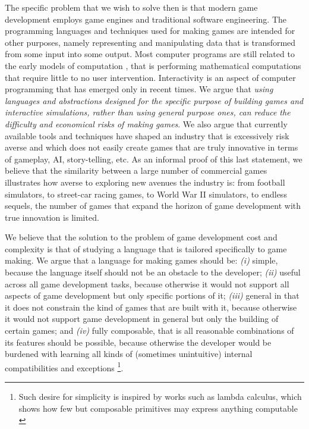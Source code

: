 The specific problem that we wish to solve then is that modern game development employs game engines and traditional software engineering. The programming languages and techniques used for making games are intended for other purposes, namely representing and manipulating data that is transformed from some input into some output. Most computer programs are still related to the early models of computation \cite{CHAPTER_1_EARLY_MODELS_OF_COMPUTATION}, that is performing mathematical computations that require little to no user intervention. Interactivity is an aspect of computer programming that has emerged only in recent times. We argue that \textit{using languages and abstractions designed for the specific purpose of building games and interactive simulations, rather than using general purpose ones, can reduce the difficulty and economical risks of making games}. We also argue that currently available tools and techniques have shaped an industry that is excessively risk averse and which does not easily create games that are truly innovative in terms of gameplay, AI, story-telling, etc. As an informal proof of this last statement, we believe that the similarity between a large number of commercial games illustrates how averse to exploring new avenues the industry is: from football simulators, to street-car racing games, to World War II simulators, to endless sequels, the number of games that expand the horizon of game development with true innovation is limited.

We believe that the solution to the problem of game development cost and complexity is that of studying a language that is tailored specifically to game making. We argue that a language for making games should be: \textit{(i)} simple, because the language itself should not be an obstacle to the developer; \textit{(ii)} useful across all game development tasks, because otherwise it would not support all aspects of game development but only specific portions of it; \textit{(iii)} general in that it does not constrain the kind of games that are built with it, because otherwise it would not support game development in general but only the building of certain games; and \textit{(iv)} fully composable, that is all reasonable combinations of its features should be possible, because otherwise the developer would be burdened with learning all kinds of (sometimes unintuitive) internal compatibilities and exceptions \footnote{Such desire for simplicity is inspired by works such as lambda calculus, which shows how few but composable primitives may express anything computable \cite{CHAPTER1_LAMBDA_CALCULUS}}.

